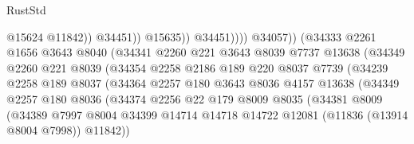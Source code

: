 \begin{lexlean}{RustStd}
\begin{coremodule}
                                                @15624
                                                @11842))
                                            @34451))
                                        @15635))
                                    @34451))))
                            @34057))
                        (@34333
                          @2261
                          @1656
                          @3643
                          @8040
                          (@34341
                            @2260
                            @221
                            @3643
                            @8039
                            @7737
                            @13638
                            (@34349
                              @2260
                              @221
                              @8039
                              (@34354
                                @2258
                                @2186
                                @189
                                @220
                                @8037
                                @7739
                                (@34239
                                  @2258
                                  @189
                                  @8037
                                  (@34364
                                    @2257
                                    @180
                                    @3643
                                    @8036
                                    @4157
                                    @13638
                                    (@34349
                                      @2257
                                      @180
                                      @8036
                                      (@34374
                                        @2256
                                        @22
                                        @179
                                        @8009
                                        @8035
                                        (@34381
                                          @8009
                                          (@34389
                                            @7997
                                            @8004
                                            @34399
                                            @14714
                                            @14718
                                            @14722
                                            @12081
                                            (@11836 (@13914 @8004 @7998))
                                            @11842))

\end{coremodule}
\end{lexlean}
